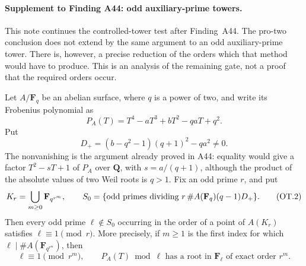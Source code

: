 \paragraph{Supplement to Finding A44: odd auxiliary-prime towers.}

This note continues the controlled-tower test after Finding~A44.
The pro-two conclusion does not extend by the same argument to an
odd auxiliary-prime tower.  There is, however, a precise reduction
of the orders which that method would have to produce.  This is
an analysis of the remaining gate, not a proof that the required
orders occur.

Let $A/\mathbf F_q$ be an abelian surface, where $q$ is a power
of two, and write its Frobenius polynomial as
\[
 P_A(T)=T^4-aT^3+bT^2-qaT+q^2.
\]
Put
\[
 D_+=(b-q^2-1)(q+1)^2-qa^2\ne0.
 \tag{OT.1}
\]
The nonvanishing is the argument already proved in A44: equality
would give a factor $T^2-sT+1$ of $P_A$ over $\mathbf Q$, with
$s=a/(q+1)$, although the product of the absolute values of two
Weil roots is $q>1$.
Fix an odd prime $r$, and put
\[
 K_r=\bigcup_{m\ge0}\mathbf F_{q^{r^m}},\qquad
 S_0=\{\hbox{odd primes dividing }
           r\,\#A(\mathbf F_q)(q-1)D_+\}.
 \tag{OT.2}
\]
Then every odd prime $\ell\notin S_0$ occurring in the order of a
point of $A(K_r)$ satisfies $\ell\equiv1\pmod r$.
More precisely, if $m\ge1$ is the first index for which
$\ell\mid\#A(\mathbf F_{q^{r^m}})$, then
\[
 \ell\equiv1\pmod{r^m},
 \qquad P_A(T)\bmod\ell
 \text{ has a root in }\mathbf F_\ell
 \text{ of exact order }r^m.
 \tag{OT.3}
\]

